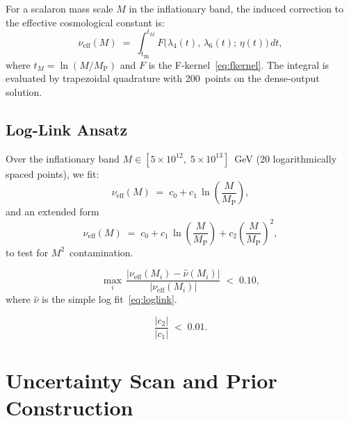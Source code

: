 \documentclass[11pt,a4paper]{article}
\theoremstyle{definition}
\theoremstyle{plain}
\theoremstyle{remark}
\newcommand{\MP}{M_{\mathrm{P}}}
\newcommand{\nueff}{\nu_{\mathrm{eff}}}
\begin{document}
For a scalaron mass scale $M$ in the inflationary band, the induced
correction to the effective cosmological constant is:
\begin{equation}
  \nueff(M)
  \;=\;
  \int_{t_{\text{IR}}}^{t_M}\!
  F\bigl(\lambda_4(t),\,\lambda_6(t);\,\eta(t)\bigr)\,dt,
  \label{eq:nueff}
\end{equation}
where $t_M=\ln(M/\MP)$ and $F$ is the F-kernel~\eqref{eq:fkernel}.
The integral is evaluated by trapezoidal quadrature with 200~points
on the dense-output solution.

\subsection{Log-Link Ansatz}

Over the inflationary band $M\in[5\times10^{12},\;5\times10^{13}]$~GeV
(20 logarithmically spaced points), we fit:
\begin{equation}
  \nueff(M)
  \;=\;
  c_0 + c_1\,\ln\!\left(\frac{M}{\MP}\right),
  \label{eq:loglink}
\end{equation}
and an extended form
\begin{equation}
  \nueff(M)
  \;=\;
  c_0 + c_1\,\ln\!\left(\frac{M}{\MP}\right)
  + c_2\left(\frac{M}{\MP}\right)^{\!2},
  \label{eq:loglink_ext}
\end{equation}
to test for $M^2$~contamination.

\begin{passcriterion}[title=Log-Link Quality]
\begin{equation}
  \max_i\,
  \frac{|\nueff(M_i)-\hat\nu(M_i)|}{|\nueff(M_i)|}
  \;<\;0.10,
  \label{eq:loglink_pass}
\end{equation}
where $\hat\nu$ is the simple log fit~\eqref{eq:loglink}.
\end{passcriterion}

\begin{passcriterion}[title=No $M^2$ Contamination]
\begin{equation}
  \frac{|c_2|}{|c_1|} \;<\; 0.01.
  \label{eq:m2_pass}
\end{equation}
\end{passcriterion}


\section{Uncertainty Scan and Prior Construction}
\label{sec:scan}
\end{document}
